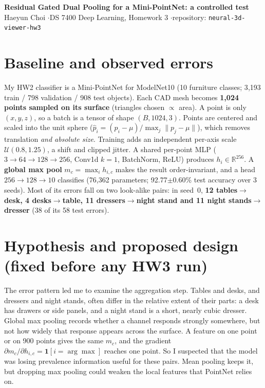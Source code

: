 \documentclass[10pt]{article}
\begin{document}
\begin{center}
{\Large\bfseries Residual Gated Dual Pooling for a Mini-PointNet: a controlled test}\\[2pt]
Haeyun Choi \quad$\cdot$\quad DS 7400 Deep Learning, Homework 3 \quad$\cdot$\quad repository: \texttt{neural-3d-viewer-hw3}
\end{center}
\vspace{-4pt}

\section{Baseline and observed errors}
My HW2 classifier is a Mini-PointNet for ModelNet10 (10 furniture classes; 3{,}193 train / 798 validation / 908 test objects).
Each CAD mesh becomes \textbf{1{,}024 points sampled on its surface} (triangles chosen $\propto$ area). A point is only $(x,y,z)$, so a batch is a tensor of shape $(B,1024,3)$.
Points are centered and scaled into the unit sphere ($\hat p_i=(p_i-\mu)/\max_j\lVert p_j-\mu\rVert$), which removes translation \emph{and absolute size}.
Training adds an independent per-axis scale $\mathcal U(0.8,1.25)$, a shift and clipped jitter.
A shared per-point MLP ($3{\to}64{\to}128{\to}256$, Conv1d $k{=}1$, BatchNorm, ReLU) produces $h_i\in\mathbb R^{256}$. A \textbf{global max pool} $m_c=\max_i h_{i,c}$ makes the result order-invariant, and a head $256{\to}128{\to}10$ classifies (76{,}362 parameters; 92.77$\pm$0.60\% test accuracy over 3 seeds).
Most of its errors fall on two look-alike pairs: in seed~0, \textbf{12 tables$\to$desk, 4 desks$\to$table, 11 dressers$\to$night stand and 11 night stands$\to$dresser} (38 of its 58 test errors).

\section{Hypothesis and proposed design (fixed before any HW3 run)}
The error pattern led me to examine the aggregation step.
Tables and desks, and dressers and night stands, often differ in the relative extent of their parts: a desk has drawers or side panels, and a night stand is a short, nearly cubic dresser.
Global max pooling records whether a channel responds strongly somewhere, but not how widely that response appears across the surface.
A feature on one point or on 900 points gives the same $m_c$, and the gradient $\partial m_c/\partial h_{i,c}=\mathbf 1[i=\arg\max]$ reaches one point.
So I suspected that the model was losing prevalence information useful for these pairs.
Mean pooling keeps it, but dropping max pooling could weaken the local features that PointNet relies on.
\end{document}
